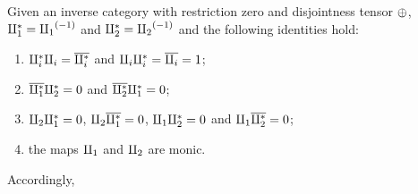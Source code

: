 \begin{lemma}\label{lem:tensor_identities}
  Given an inverse category \X with restriction zero and disjointness tensor $\oplus$,
  $\amalg_{1}^{*} = {\amalg_{1}}^{(-1)}$ and $\amalg_{2}^{*} = {\amalg_{2}}^{(-1)}$ and the following identities hold:
  \begin{enumerate}
    \item $\amalg_{i}^{*} \amalg_{i} = \overline{\amalg_{i}^{*}}$ and $\amalg_{i}\amalg_{i}^{*} = \overline{\amalg_{i}} = 1$;
    \item $\overline{\amalg_{1}^{*}} \amalg_{2}^{*} = 0$ and $\overline{\amalg_{2}^{*}} \amalg_{1}^{*} = 0$;
    \item $\amalg_{2} \amalg_{1}^{*} = 0$, $\amalg_{2} \overline{\amalg_{1}^{*}} = 0$,  $\amalg_{1} \amalg_{2}^{*} = 0$ and
      $\amalg_{1} \overline{\amalg_{2}^{*}} = 0$;
    \item the maps $\amalg_{1}$ and $\amalg_{2}$ are monic.
  \end{enumerate}
  Accordingly,
\end{lemma}

